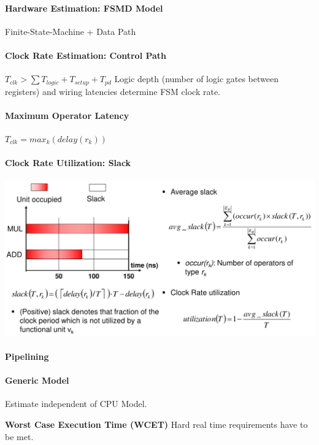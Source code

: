\documentclass[english]{latex4ei/latex4ei_sheet}
\begin{document}
\paragraph{Hardware Estimation: FSMD Model}
Finite-State-Machine + Data Path

\paragraph{Clock Rate Estimation: Control Path}
$T_{clk} > \sum T_{logic} + T_{setup} + T_{pd}$
Logic depth (number of logic gates between registers) and wiring latencies determine FSM clock rate.

\paragraph{Maximum Operator Latency}
$T_{clk} = max_k(delay(r_k))$

\paragraph{Clock Rate Utilization: Slack}

\begin{center}
  \includegraphics[width=\linewidth]{assets/Slack.png}
  \label{fig:slack}
\end{center}

\paragraph{Pipelining}

\paragraph{Generic Model}
Estimate independent of CPU Model.

\textbf{Worst Case Execution Time (WCET)}
Hard real time requirements have to be met.
\end{document}
